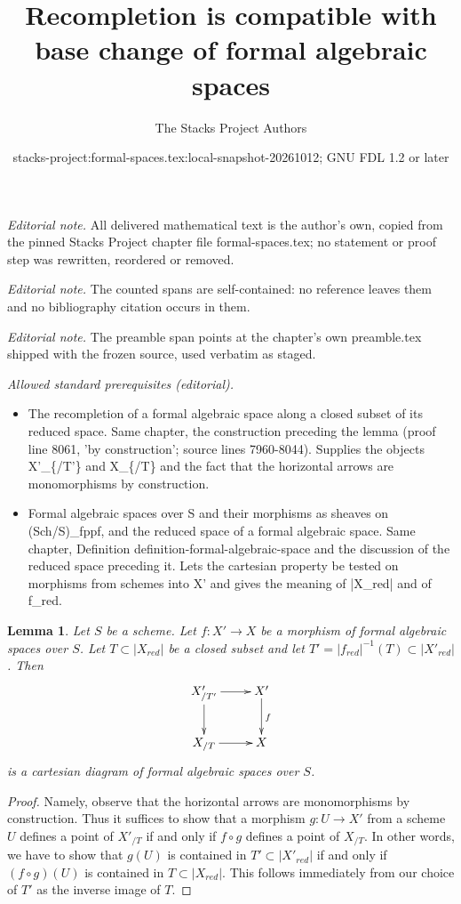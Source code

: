 \documentclass{stacks-project}
\title{Recompletion is compatible with base change of formal algebraic spaces}
\author{The Stacks Project Authors}
\date{stacks-project:formal-spaces.tex:local-snapshot-20261012; GNU FDL 1.2 or later}
\theoremstyle{plain}
\newtheorem{lemma}[subsection]{Lemma}
\theoremstyle{definition}
\theoremstyle{remark}
\numberwithin{equation}{subsection}
\begin{document}
\maketitle
\noindent\textit{Editorial note.} All delivered mathematical text is the author's own, copied from the pinned Stacks Project chapter file formal-spaces.tex; no statement or proof step was rewritten, reordered or removed.\par\medskip
\noindent\textit{Editorial note.} The counted spans are self-contained: no reference leaves them and no bibliography citation occurs in them.\par\medskip
\noindent\textit{Editorial note.} The preamble span points at the chapter's own preamble.tex shipped with the frozen source, used verbatim as staged.\par\medskip
\noindent\textit{Allowed standard prerequisites (editorial).}\begin{itemize}
\item The recompletion of a formal algebraic space along a closed subset of its reduced space. Same chapter, the construction preceding the lemma (proof line 8061, 'by construction'; source lines 7960-8044). Supplies the objects X'\_\{/T'\} and X\_\{/T\} and the fact that the horizontal arrows are monomorphisms by construction.
\item Formal algebraic spaces over S and their morphisms as sheaves on (Sch/S)\_fppf, and the reduced space of a formal algebraic space. Same chapter, Definition definition-formal-algebraic-space and the discussion of the reduced space preceding it. Lets the cartesian property be tested on morphisms from schemes into X' and gives the meaning of |X\_red| and of f\_red.
\end{itemize}\medskip
\begin{lemma}
\label{lemma-map-recompletions}
Let $S$ be a scheme. Let $f : X' \to X$ be a morphism
of formal algebraic spaces over $S$. Let $T \subset |X_{red}|$
be a closed subset and let $T' = |f_{red}|^{-1}(T) \subset |X'_{red}|$.
Then
$$
\xymatrix{
X'_{/T'} \ar[r] \ar[d] & X' \ar[d]^f \\
X_{/T} \ar[r] & X
}
$$
is a cartesian diagram of formal algebraic spaces over $S$.
\end{lemma}

\begin{proof}
Namely, observe that the horizontal arrows are monomorphisms
by construction. Thus it suffices to show that a morphism
$g : U \to X'$ from a scheme $U$ defines a point of $X'_{/T}$
if and only if $f \circ g$ defines a point of $X_{/T}$.
In other words, we have to show that
$g(U)$ is contained in $T' \subset |X'_{red}|$
if and only if $(f \circ g)(U)$ is contained in $T \subset |X_{red}|$.
This follows immediately from our choice of $T'$ as the
inverse image of $T$.
\end{proof}
\end{document}

